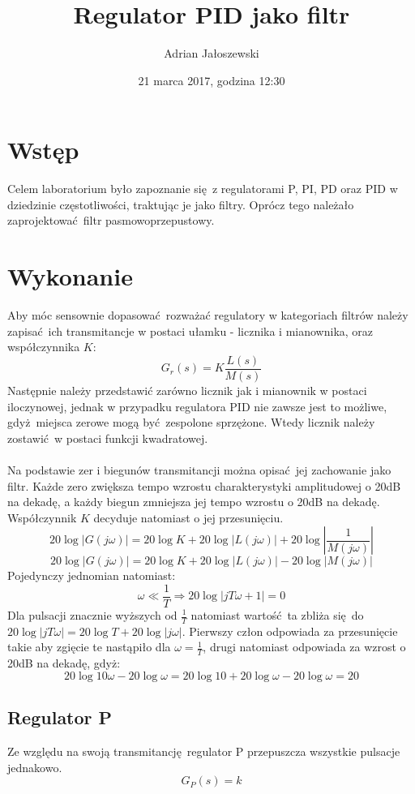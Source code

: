 \documentclass[a4paper, 12pt]{article}
\title{Regulator PID jako filtr}
\author{Adrian Jałoszewski}
\date{21 marca 2017, godzina 12:30}
\begin{document}
	\lstset{language=Python, basicstyle=\footnotesize,
		keepspaces=true,frame=single,tabsize=4}
	\maketitle
	\section{Wstęp}
		Celem laboratorium było zapoznanie się z regulatorami P, PI, PD oraz PID w dziedzinie częstotliwości, traktując je jako filtry. Oprócz tego należało zaprojektować filtr pasmowoprzepustowy.
	\section{Wykonanie}
		Aby móc sensownie dopasować rozważać regulatory w kategoriach filtrów należy zapisać ich transmitancje w postaci ułamku - licznika i mianownika, oraz współczynnika $K$:
		$$
			G_r(s) = K\frac{L(s)}{M(s)}
		$$
		Następnie należy przedstawić zarówno licznik jak i mianownik w postaci iloczynowej, jednak w przypadku regulatora PID nie zawsze jest to możliwe, gdyż miejsca zerowe mogą być zespolone sprzężone. Wtedy licznik należy zostawić w postaci funkcji kwadratowej. 
		\\
		\\
		Na podstawie zer i biegunów transmitancji można opisać jej zachowanie jako filtr. Każde zero zwiększa tempo wzrostu charakterystyki amplitudowej o 20dB na dekadę, a każdy biegun zmniejsza jej tempo wzrostu o 20dB na dekadę. Współczynnik $K$ decyduje natomiast o jej przesunięciu.
		$$
			20 \log |G(j\omega)| = 20 \log K + 20 \log |L(j\omega)| + 20 \log \left|\frac{1}{M(j\omega)}\right|
		$$
		$$
			20 \log |G(j\omega)| =  20 \log K + 20 \log |L(j\omega)| - 20 \log \left|M(j\omega)\right|
		$$ 
		Pojedynczy jednomian natomiast:
		$$
			\omega \ll \frac{1}{T} \Rightarrow 20 \log |jT\omega + 1| = 0 
		$$
		Dla pulsacji znacznie wyższych od $\frac{1}{T}$ natomiast wartość ta zbliża się do \linebreak $20 \log |jT\omega| = 20\log T + 20 \log |j\omega|$. Pierwszy człon odpowiada za przesunięcie takie aby zgięcie te nastąpiło dla $\omega = \frac{1}{T}$, drugi natomiast odpowiada za wzrost o 20dB na dekadę, gdyż: 
		$$
			20\log 10\omega - 20\log \omega = 20 \log 10 + 20 \log \omega - 20 \log \omega = 20
		$$
		\subsection{Regulator P}
			Ze względu na swoją transmitancję regulator P przepuszcza wszystkie pulsacje jednakowo.
			$$
				G_P(s) = k
			$$
\end{document}
